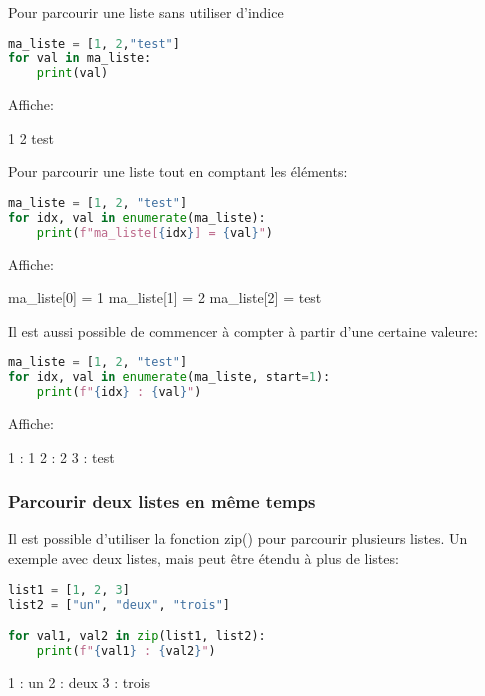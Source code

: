 Pour parcourir une liste sans utiliser d'indice
\begin{lstlisting}[language=Python]
ma_liste = [1, 2,"test"]
for val in ma_liste:
    print(val)
\end{lstlisting}
Affiche:
\begin{terminal}
1
2
test
\end{terminal}

Pour parcourir une liste tout en comptant les éléments:
\begin{lstlisting}[language=Python]
ma_liste = [1, 2, "test"]
for idx, val in enumerate(ma_liste):
    print(f"ma_liste[{idx}] = {val}")
\end{lstlisting}
Affiche:
\begin{terminal}
ma_liste[0] = 1
ma_liste[1] = 2
ma_liste[2] = test
\end{terminal}

Il est aussi possible de commencer à compter à partir d'une certaine valeure:
\begin{lstlisting}[language=Python]
ma_liste = [1, 2, "test"]
for idx, val in enumerate(ma_liste, start=1):
    print(f"{idx} : {val}")
\end{lstlisting}
Affiche:
\begin{terminal}
1 : 1
2 : 2
3 : test
\end{terminal}

\subsubsection{Parcourir deux listes en même temps}

Il est possible d'utiliser la fonction zip() pour parcourir plusieurs listes. Un exemple avec deux listes, mais peut être étendu à plus de listes:

\begin{lstlisting}[language=Python]
list1 = [1, 2, 3]
list2 = ["un", "deux", "trois"]

for val1, val2 in zip(list1, list2):
    print(f"{val1} : {val2}")
\end{lstlisting}

\begin{terminal}
1 : un
2 : deux
3 : trois
\end{terminal}


